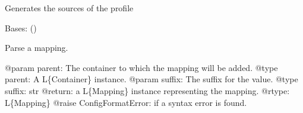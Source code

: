 \documentclass[a4paper,10pt,english]{sphinxmanual}
\begin{document}

\begin{fulllineitems}
\label{\detokenize{apidoc_commands/commands:commands.profile.generate_profile_sources}}
Generates the sources of the profile

\end{fulllineitems}


\begin{fulllineitems}
\label{\detokenize{apidoc_commands/commands:commands.profile.get_profile_name}}
\end{fulllineitems}


\begin{fulllineitems}
\label{\detokenize{apidoc_commands/commands:commands.profile.profileConfigReader}}
Bases: {\hyperref[\detokenize{apidoc_src/src:src.pyconf.ConfigReader}]{}} ()

\begin{fulllineitems}
\label{\detokenize{apidoc_commands/commands:commands.profile.profileConfigReader.parseMapping}}
Parse a mapping.

@param parent: The container to which the mapping will be added.
@type parent: A L\{Container\} instance.
@param suffix: The suffix for the value.
@type suffix: str
@return: a L\{Mapping\} instance representing the mapping.
@rtype: L\{Mapping\}
@raise ConfigFormatError: if a syntax error is found.

\end{fulllineitems}


\end{fulllineitems}
\end{document}
